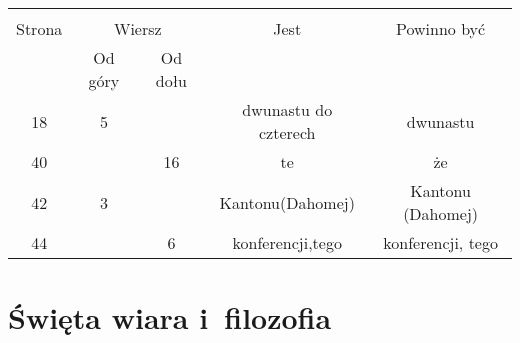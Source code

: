 \documentclass[a4paper,11pt]{article}
\begin{document}
\vspace{\spaceTwo}









%
%
%

\begin{center}

  \begin{tabular}{|c|c|c|c|c|}
    \hline
    & \multicolumn{2}{c|}{} & & \\
    Strona & \multicolumn{2}{c|}{Wiersz} & Jest
                              & Powinno być \\ \cline{2-3}
    & Od góry & Od dołu & & \\
    \hline
    18  &  5 & & dwunastu do czterech & dwunastu \\
    40  & & 16 & te & że \\
    42  &  3 & & Kantonu(Dahomej) & Kantonu (Dahomej) \\
    44  & &  6 & konferencji,tego & konferencji, tego \\
    \hline
  \end{tabular}

\end{center}











\newpage
\section{Święta wiara i~filozofia}

\vspace{\spaceTwo}
\end{document}
